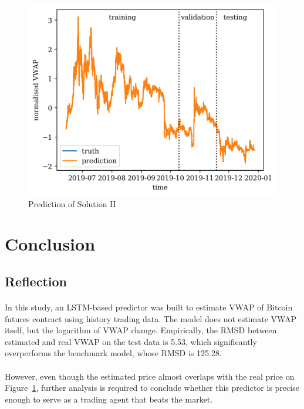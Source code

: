 \documentclass[12pt, letterpaper]{article}
\begin{document}
\begin{figure}
    \centering
    \includegraphics{figures/pred_lstmratio.png}
    \caption{Prediction of Solution II}%
    \label{fig:pred2}
\end{figure}

\section{Conclusion}

\subsection{Reflection}

\paragraph{}
In this study, an LSTM-based predictor was built to estimate VWAP of Bitcoin futures contract using history trading data. The model does not estimate VWAP itself, but the logarithm of VWAP change. Empirically, the RMSD between estimated and real VWAP on the test data is 5.53, which significantly overperforms the benchmark model, whose RMSD is 125.28.

\paragraph{}
However, even though the estimated price almost overlaps with the real price on Figure~\ref{fig:pred2}, further analysis is required to conclude whether this predictor is precise enough to serve as a trading agent that beats the market.
\end{document}
